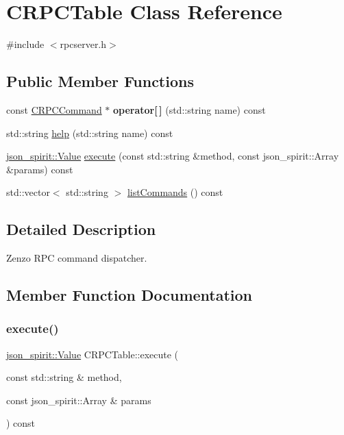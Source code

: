 \hypertarget{class_c_r_p_c_table}{}\section{C\+R\+P\+C\+Table Class Reference}
\label{class_c_r_p_c_table}


{\ttfamily \#include $<$rpcserver.\+h$>$}

\subsection*{Public Member Functions}
\begin{DoxyCompactItemize}
\item 
\mbox{\label{class_c_r_p_c_table_a3d0faa5bfca42b473063981fa8d0fa75}} 
const \mbox{\hyperlink{class_c_r_p_c_command}{C\+R\+P\+C\+Command}} $\ast$ {\bfseries operator\mbox{[}$\,$\mbox{]}} (std\+::string name) const
\item 
std\+::string \mbox{\hyperlink{class_c_r_p_c_table_aaba3a5908a430d07084292d5a894c812}{help}} (std\+::string name) const
\item 
\mbox{\hyperlink{classjson__spirit_1_1_value__impl}{json\+\_\+spirit\+::\+Value}} \mbox{\hyperlink{class_c_r_p_c_table_a18a39759205e739d86a35a1c92243760}{execute}} (const std\+::string \&method, const json\+\_\+spirit\+::\+Array \&params) const
\item 
std\+::vector$<$ std\+::string $>$ \mbox{\hyperlink{class_c_r_p_c_table_a7ebce2fd23e8343e42d36a9bcd02de95}{list\+Commands}} () const
\end{DoxyCompactItemize}


\subsection{Detailed Description}
Zenzo R\+PC command dispatcher. 

\subsection{Member Function Documentation}
\mbox{\label{class_c_r_p_c_table_a18a39759205e739d86a35a1c92243760}} 
\subsubsection{\texorpdfstring{execute()}{execute()}}
{\footnotesize\ttfamily \mbox{\hyperlink{classjson__spirit_1_1_value__impl}{json\+\_\+spirit\+::\+Value}} C\+R\+P\+C\+Table\+::execute (\begin{DoxyParamCaption}\item[{const std\+::string \&}]{method,  }\item[{const json\+\_\+spirit\+::\+Array \&}]{params }\end{DoxyParamCaption}) const}

